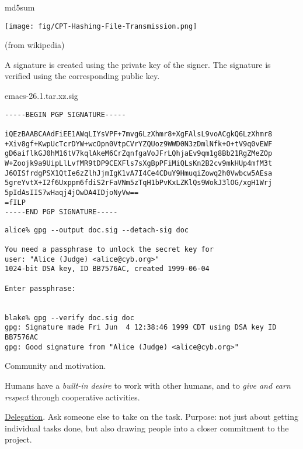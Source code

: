 \documentclass[landscape,30pt]{foils}
\begin{document}
md5sum

\begin{center}
\texttt{[image: fig/CPT-Hashing-File-Transmission.png]}
\end{center}

(from wikipedia)


A signature is created using the private key of the signer. The signature is verified using the corresponding public key.

emacs-26.1.tar.xz.sig

{\tiny
\begin{verbatim}
-----BEGIN PGP SIGNATURE-----

iQEzBAABCAAdFiEE1AWqLIYsVPF+7mvg6LzXhmr8+XgFAlsL9voACgkQ6LzXhmr8
+Xiv8gf+KwpUcTcrDYW+wcOpn0VtpCVrYZQUoz9WWD0N3zDmlNfk+O+tV9q0vEWF
gD6aiflkGJ0hM16tV7kqlAkeM6CrZqnfgaVoJFrLQhjaEv9qm1g8Bb21RgZMeZOp
W+Zoojk9a9UipLlLvfMR9tDP9CEXFls7sXgBpPFiMiQLsKn2B2cv9mkHUp4mfM3t
J6OISfrdgPSX1QtIe6zZlhJjmIgK1vA7I4Ce4CDuY9HmuqiZowq2h0Vwbcw5AEsa
5greYvtX+I2f6Uxppm6fdiS2rFaVNm5zTqH1bPvKxLZKlQs9WokJ3lOG/xgH1Wrj
5pIdAsIIS7wHaqj4jOwDA4IDjoNyVw==
=fILP
-----END PGP SIGNATURE-----
\end{verbatim}
}

{\tiny
\begin{verbatim}
alice% gpg --output doc.sig --detach-sig doc

You need a passphrase to unlock the secret key for
user: "Alice (Judge) <alice@cyb.org>"
1024-bit DSA key, ID BB7576AC, created 1999-06-04

Enter passphrase: 


blake% gpg --verify doc.sig doc
gpg: Signature made Fri Jun  4 12:38:46 1999 CDT using DSA key ID BB7576AC
gpg: Good signature from "Alice (Judge) <alice@cyb.org>"

\end{verbatim}
}


Community and motivation.

Humans have a {\em built-in desire} to work with other humans, and to {\em give and earn respect} through cooperative activities.



\underline{Delegation}.  Ask someone else to take on the task.  Purpose: not just about getting individual tasks done, but also drawing people into a closer commitment to the project.
\end{document}
